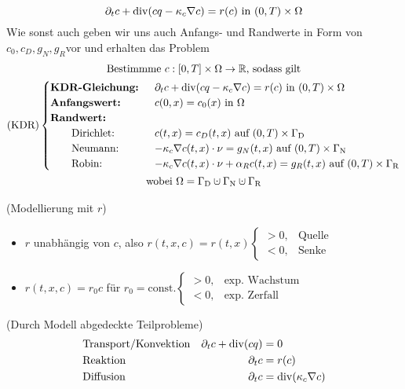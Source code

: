 \[ \partial_t c + \operatorname{div}(c q - \kappa_c \nabla c) = r(c) \text{ in } (0,T) \times \Omega \]
Wie sonst auch geben wir uns auch Anfangs- und Randwerte in Form von $ c_0, c_D, g_N, g_R $vor und erhalten das Problem
\begin{gather*}
	\text{Bestimmme } c:[0,T] \times \Omega \to \R \text{, sodass gilt}\\
	\KDR \begin{cases}
		\text{\textbf{KDR-Gleichung: }}&\partial_t c + \dive(c q - \kappa_c \nabla c) = r(c) \text{ in } (0,T) \times \Omega\\
		\text{\textbf{Anfangswert: }} &c(0,x) = c_0(x) \text{ in } \Omega\\
		\text{\textbf{Randwert:}}\\
		\qquad \text{Dirichlet: } &c(t,x) = c_D(t,x) \text{ auf } (0,T) \times \GammaD \\
		\qquad \text{Neumann: } &-\kappa_c \nabla c(t,x) \cdot \nu = g_N(t,x) \text{ auf } (0,T) \times \GammaN \\
		\qquad \text{Robin: } &-\kappa_c \nabla c(t,x) \cdot \nu + \alpha_R c(t,x) = g_R(t,x) \text{ auf } (0,T) \times \GammaR
	\end{cases}\\
	\text{wobei } \Omega = \GammaD \cupdot \GammaN \cupdot \GammaR
\end{gather*}

\begin{remark}
	(Modellierung mit $ r $)
	\begin{itemize}
		\item $ r $ unabhängig von $ c $, also $ r(t,x,c) = r(t,x) \begin{cases}
		> 0, &\text{Quelle}\\
		< 0, &\text{Senke}
		\end{cases} $
		\item $ r(t,x,c) = r_0 c $ für $ r_0 = \text{const.} \begin{cases}
		> 0, &\text{exp. Wachstum}\\
		< 0, &\text{exp. Zerfall}
		\end{cases} $
	\end{itemize}
\end{remark}

\begin{remark}
	(Durch Modell abgedeckte Teilprobleme)
	\begin{align*}
	&\text{Transport/Konvektion} & \partial_t c + \operatorname{div}(cq) &= 0\\
	&\text{Reaktion} & \partial_t c &= r(c)\\
	&\text{Diffusion} & \partial_t c &= \operatorname{div}(\kappa_c \nabla c)
	\end{align*}
\end{remark}

